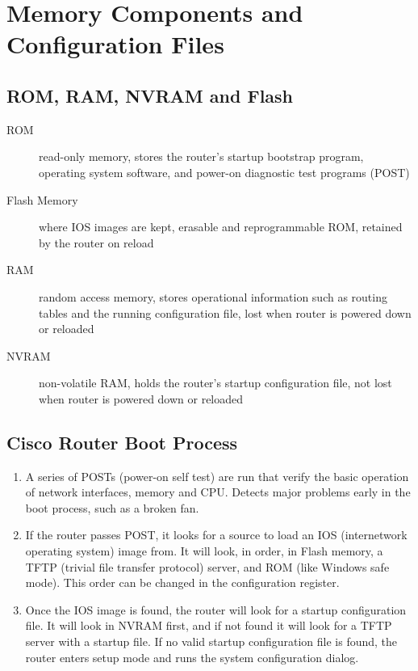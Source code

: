 \section{Memory Components and Configuration Files}

\subsection{ROM, RAM, NVRAM and Flash}

\begin{description}

\item[ROM]
read-only memory, stores the router's startup bootstrap program, operating
system software, and power-on diagnostic test programs (POST)

\item[Flash Memory]
where IOS images are kept, erasable and reprogrammable ROM, retained by the
router on reload

\item[RAM]
random access memory, stores operational information such as routing tables
and the running configuration file, lost when router is powered down or
reloaded

\item[NVRAM]
non-volatile RAM, holds the router's startup configuration file, not lost
when router is powered down or reloaded
\end{description}

\subsection{Cisco Router Boot Process}

\begin{enumerate}

\item A series of POSTs (power-on self test) are run that verify the basic
operation of network interfaces, memory and CPU. Detects major problems early
in the boot process, such as a broken fan.

\item If the router passes POST, it looks for a source to load an IOS
(internetwork operating system) image from. It will look, in order, in
Flash memory, a TFTP (trivial file transfer protocol) server, and ROM (like
Windows safe mode). This order can be changed in the configuration register.

\item Once the IOS image is found, the router will look for a startup
configuration file. It will look in NVRAM first, and if not found it will
look for a TFTP server with a startup file. If no valid startup
configuration file is found, the router enters setup mode and runs the
system configuration dialog.

\end{enumerate}

